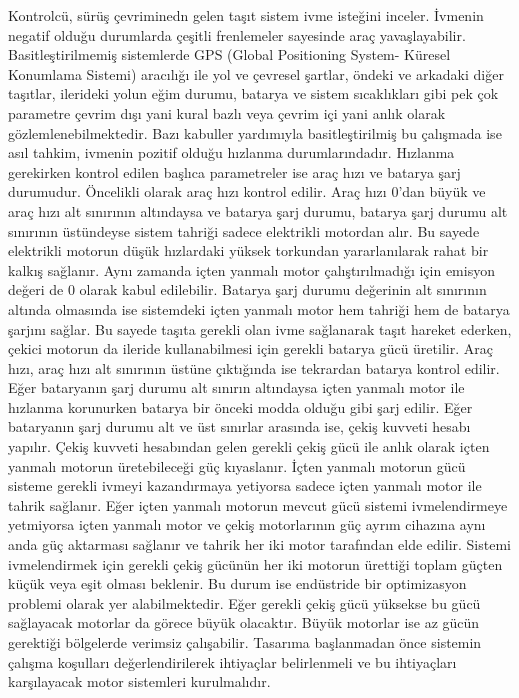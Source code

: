 Kontrolcü, sürüş çevriminedn gelen taşıt sistem ivme isteğini inceler. İvmenin negatif olduğu durumlarda çeşitli frenlemeler sayesinde araç yavaşlayabilir. Basitleştirilmemiş sistemlerde GPS (Global Positioning System- Küresel Konumlama Sistemi) aracılığı ile yol ve çevresel şartlar, öndeki ve arkadaki diğer taşıtlar, ilerideki yolun eğim durumu, batarya ve sistem sıcaklıkları gibi pek çok parametre 
çevrim dışı yani kural bazlı veya çevrim içi yani anlık olarak gözlemlenebilmektedir. Bazı kabuller yardımıyla basitleştirilmiş bu çalışmada ise asıl tahkim, ivmenin pozitif olduğu hızlanma durumlarındadır.
Hızlanma gerekirken kontrol edilen başlıca parametreler ise araç hızı ve batarya şarj durumudur. Öncelikli olarak araç hızı kontrol edilir. Araç hızı 0'dan büyük ve araç hızı alt sınırının altındaysa ve batarya şarj durumu, batarya şarj durumu alt sınırının üstündeyse sistem tahriği sadece elektrikli motordan alır.
Bu sayede elektrikli motorun düşük hızlardaki yüksek torkundan yararlanılarak rahat bir kalkış sağlanır. Aynı zamanda içten yanmalı motor çalıştırılmadığı için emisyon değeri de 0 olarak kabul edilebilir.
Batarya şarj durumu değerinin alt sınırının altında olmasında ise sistemdeki içten yanmalı motor hem tahriği hem de batarya şarjını sağlar. Bu sayede taşıta gerekli olan ivme sağlanarak taşıt hareket ederken, çekici motorun da ileride kullanabilmesi için gerekli batarya gücü üretilir.
Araç hızı, araç hızı alt sınırının üstüne çıktığında ise tekrardan batarya kontrol edilir. Eğer bataryanın şarj durumu alt sınırın altındaysa içten yanmalı motor ile hızlanma korunurken batarya bir önceki modda olduğu gibi şarj edilir.
Eğer bataryanın şarj durumu alt ve üst sınırlar arasında ise, çekiş kuvveti hesabı yapılır. Çekiş kuvveti hesabından gelen gerekli çekiş gücü ile anlık olarak içten yanmalı motorun üretebileceği güç kıyaslanır. İçten yanmalı motorun gücü sisteme gerekli
ivmeyi kazandırmaya yetiyorsa sadece içten yanmalı motor ile tahrik sağlanır. Eğer içten yanmalı motorun mevcut gücü sistemi ivmelendirmeye yetmiyorsa içten yanmalı motor ve çekiş motorlarının güç ayrım cihazına aynı anda güç aktarması sağlanır ve tahrik her iki motor tarafından elde edilir.
Sistemi ivmelendirmek için gerekli çekiş gücünün her iki motorun ürettiği toplam güçten küçük veya eşit olması beklenir. Bu durum ise endüstride bir optimizasyon problemi olarak yer alabilmektedir. Eğer gerekli çekiş gücü yüksekse bu gücü sağlayacak motorlar da görece büyük olacaktır. Büyük motorlar ise az gücün gerektiği bölgelerde 
verimsiz çalışabilir. Tasarıma başlanmadan önce sistemin çalışma koşulları değerlendirilerek ihtiyaçlar belirlenmeli ve bu ihtiyaçları karşılayacak motor sistemleri kurulmalıdır.

